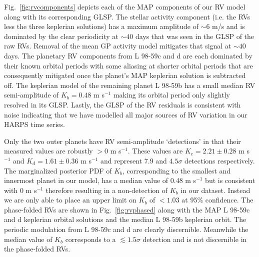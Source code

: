 \documentclass[longauth]{aa}
\newcommand{\mps}{m s$^{-1}$}
\begin{document}
Fig.~\ref{fig:rvcomponents} depicts each of the MAP components of our RV model along with its corresponding GLSP. The stellar activity component (i.e. the RVs less the three keplerian solutions) has a maximum amplitude of $\sim 6$ m/s and is dominated by the clear periodicity at $\sim 40$ days that was seen in the GLSP of the raw RVs. Removal of the mean GP activity model mitigates that signal at $\sim 40$ days. The planetary RV components from L 98-59c and d are each dominated by their known orbital periods with some aliasing at shorter orbital periods that are consequently mitigated once the planet's MAP keplerian solution is subtracted off. The keplerian model of the remaining planet L 98-59b has a small median RV semi-amplitude of $K_b = 0.48$ \mps{} making its orbital period only slightly resolved in its GLSP. Lastly, the GLSP of the RV residuals is consistent with noise indicating that we have modelled all major sources of RV variation in our HARPS time series.

\begin{figure*}
    \centering
    \caption{RV time series (\emph{left column}) of each physical component included in our model of the L 98-59 RVs along with its GLSP (\emph{right column}). In addition to the raw RVs (\emph{top panel}), also depicted is the RV activity (\emph{second panel}), the three L 98-59 planets (\emph{third, fourth, and fifth panels}), and the RV residuals (\emph{bottom panel}). The RV activity model depicted is the mean GP function along with its $\pm 1\sigma$ uncertainty in the surrounding shaded region. The L 98-59c and d planet curves are their MAP keplerian orbital solutions while the L 98-59b curve is its median keplerian orbit.}
    \label{fig:rvcomponents}
\end{figure*}

Only the two outer planets have RV semi-amplitude `detections' in that their measured values are robustly $>0$ \mps{.} These values are $K_c=2.21\pm 0.28$ \mps{} and $K_d=1.61\pm 0.36$ \mps{} and represent 7.9 and $4.5\sigma$ detections respectively. The marginalized posterior PDF of $K_b$, corresponding to the smallest and innermost planet in our model, has a median value of 0.48 \mps{} but is consistent with 0 \mps{} therefore resulting in a non-detection of $K_b$ in our dataset. Instead we are only able to place an upper limit on $K_b$ of $<1.03$ at 95\% confidence. The phase-folded RVs are shown in Fig.~\ref{fig:rvphased} along with the MAP L 98-59c and d keplerian orbital solutions and the median L 98-59b keplerian orbit. The periodic modulation from L 98-59c and d are clearly discernible. Meanwhile the median value of $K_b$ corresponds to a $\lesssim 1.5\sigma$ detection and is not discernible in the phase-folded RVs.
\end{document}
